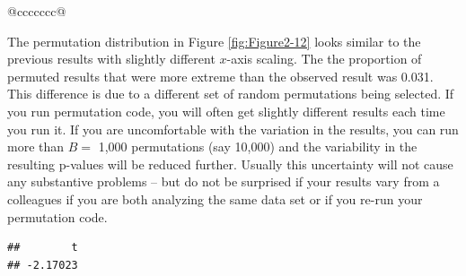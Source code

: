 \documentclass[]{book}
\newenvironment{Shaded}{\begin{snugshade}}{\end{snugshade}}
\newcommand{\KeywordTok}[1]{\textcolor[rgb]{0.13,0.29,0.53}{\textbf{#1}}}
\newcommand{\DataTypeTok}[1]{\textcolor[rgb]{0.13,0.29,0.53}{#1}}
\newcommand{\DecValTok}[1]{\textcolor[rgb]{0.00,0.00,0.81}{#1}}
\newcommand{\StringTok}[1]{\textcolor[rgb]{0.31,0.60,0.02}{#1}}
\newcommand{\OtherTok}[1]{\textcolor[rgb]{0.56,0.35,0.01}{#1}}
\newcommand{\ControlFlowTok}[1]{\textcolor[rgb]{0.13,0.29,0.53}{\textbf{#1}}}
\newcommand{\OperatorTok}[1]{\textcolor[rgb]{0.81,0.36,0.00}{\textbf{#1}}}
\newcommand{\NormalTok}[1]{#1}
\theoremstyle{definition}
\theoremstyle{definition}
\theoremstyle{remark}
\begin{document}
\begin{longtable}[]{@{}ccccccc@{}}
\begin{minipage}[b]{0.10\columnwidth}
The permutation distribution in Figure \ref{fig:Figure2-12} looks
similar to the previous results with slightly different \(x\)-axis
scaling. The the proportion of permuted results that were more extreme
than the observed result was 0.031. This difference is due to a
different set of random permutations being selected. If you run
permutation code, you will often get slightly different results each
time you run it. If you are uncomfortable with the variation in the
results, you can run more than \(B=\) 1,000 permutations (say 10,000)
and the variability in the resulting p-values will be reduced further.
Usually this uncertainty will not cause any substantive problems -- but
do not be surprised if your results vary from a colleagues if you are
both analyzing the same data set or if you re-run your permutation code.

\begin{Shaded}
\end{Shaded}

\begin{verbatim}
##        t 
## -2.17023
\end{verbatim}

\begin{Shaded}
\end{Shaded}


\end{minipage}
\end{longtable}
\end{document}
